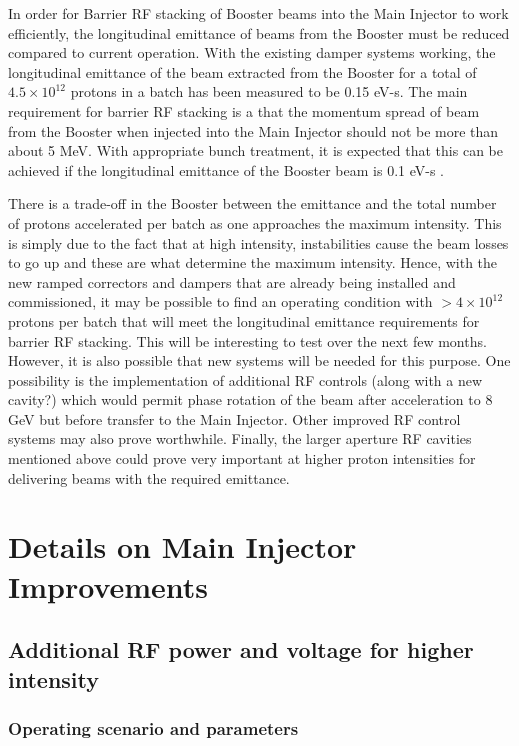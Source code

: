 \documentclass{article}
\begin{document}
  In order for Barrier RF stacking of Booster beams into the Main Injector
to work efficiently, the longitudinal emittance of beams from the Booster must
be reduced compared to current operation. With the existing damper systems
working, the longitudinal emittance of the beam extracted from the Booster
for a total of $4.5 \times 10^{12}$ protons in a batch has been measured to
be 0.15 eV-s. The main requirement for barrier RF stacking is a that the
momentum spread of beam from the Booster when injected into the Main Injector
should not be more than about 5 MeV. With appropriate bunch treatment, it is
expected that this can be achieved if the longitudinal emittance
of the Booster beam is 0.1 eV-s \cite {Ng}. 

There is a trade-off in the Booster between the emittance and the total 
number of protons accelerated per batch as one approaches the maximum
intensity. This is simply due to the fact that at high intensity, instabilities
cause the beam losses to go up and these are what determine the maximum
intensity. Hence, with the new ramped correctors and dampers 
that are already being 
installed and commissioned, it may be possible to find an
operating condition with $>4\times10^{12}$ protons per batch that will meet
the longitudinal emittance requirements for barrier RF stacking. This will
be interesting to test over the next few months. However, it is also possible
that new systems will be needed for this purpose. One possibility is
the implementation of additional RF controls (along with a new cavity?) which
would permit phase rotation of the beam after acceleration to 8 GeV but
before transfer to the Main Injector. Other improved RF control systems 
may also prove worthwhile. Finally, the larger aperture RF cavities mentioned
above could prove very important at higher proton intensities for
delivering beams with the required emittance.

\section{Details on Main Injector Improvements}

\subsection {Additional RF power and voltage for higher intensity}
\label {sec:MIRF}

\subsubsection {Operating scenario and parameters}
\end{document}
